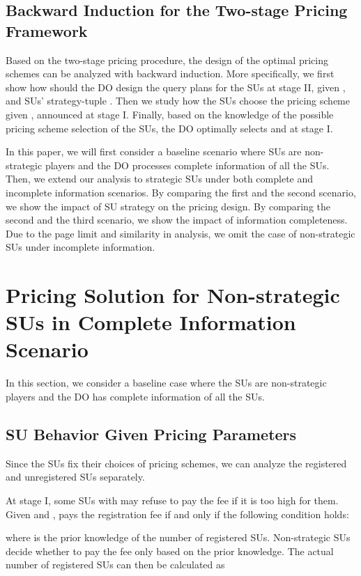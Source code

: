 \documentclass[journal]{IEEEtran}
\begin{document}
\subsection{Backward Induction for the Two-stage Pricing Framework}

Based on the two-stage pricing procedure, the design of the optimal pricing schemes can be analyzed with backward induction. More specifically, we first show how should the DO design the query plans for the SUs at stage II, given ,  and SUs' strategy-tuple . Then we study how the SUs choose the pricing scheme given ,  announced at stage I. Finally, based on the knowledge of the possible pricing scheme selection of the SUs, the DO optimally selects  and  at stage I.

In this paper, we will first consider a baseline scenario where SUs are non-strategic players and the DO processes complete information of all the SUs. Then, we extend our analysis to strategic SUs under both complete and incomplete information scenarios. By comparing the first and the second scenario, we show the impact of SU strategy on the pricing design. By comparing the second and the third scenario, we show the impact of information completeness. Due to the page limit and similarity in analysis, we omit the case of non-strategic SUs under incomplete information.

\section{Pricing Solution for Non-strategic SUs in Complete Information Scenario}
\label{sec:non-strategic_complete}

In this section, we consider a baseline case where the SUs are non-strategic players and the DO has complete information of all the SUs.

\subsection{SU Behavior Given Pricing Parameters}

Since the SUs fix their choices of pricing schemes, we can analyze the registered and unregistered SUs separately.

At stage I, some SUs with  may refuse to pay the fee if it is too high for them. Given  and ,  pays the registration fee if and only if the following condition holds:

where  is the prior knowledge of the number of registered SUs. Non-strategic SUs decide whether to pay the fee only based on the prior knowledge.
The actual number of registered SUs can then be calculated as
\end{document}
